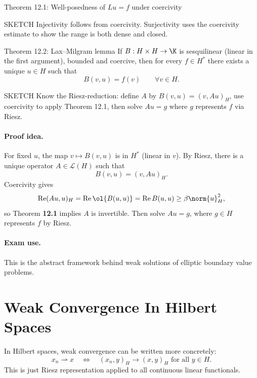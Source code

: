 \documentclass[header={Lecture 8 Exam Study Notes}]{study-note}
\begin{document}
\begin{thmbox}{Theorem 12.1: Well-posedness of $Lu=f$ under coercivity}
\thmCoerciveBijective
\end{thmbox}

\begin{prooflevelbox}{SKETCH}
Injectivity follows from coercivity. Surjectivity uses the coercivity estimate to show the range is both dense and closed.
\end{prooflevelbox}

\begin{thmbox}{Theorem 12.2: Lax--Milgram lemma}
If $B:H\times H\to\K$ is sesquilinear (linear in the first argument), bounded and coercive, then for every $f\in H^*$ there exists a unique $u\in H$ such that
\[
B(v,u)=f(v) \qquad \forall v\in H.
\]
\end{thmbox}

\begin{prooflevelbox}{SKETCH}
Know the Riesz-reduction: define $A$ by $B(v,u)=(v,Au)_H$, use coercivity to apply Theorem 12.1, then solve $Au=g$ where $g$ represents $f$ via Riesz.
\end{prooflevelbox}

\paragraph{Proof idea.}
For fixed $u$, the map $v\mapsto B(v,u)$ is in $H^*$ (linear in $v$). By Riesz, there is a unique operator $A\in\mathcal L(H)$ such that
\[
B(v,u)=(v,Au)_H.
\]
Coercivity gives
\[
\operatorname{Re}(Au,u)_H=\operatorname{Re}\ol{B(u,u)}=\operatorname{Re}B(u,u)\ge \beta\norm{u}_H^2,
\]
so Theorem \textbf{12.1} implies $A$ is invertible. Then solve $Au=g$, where $g\in H$ represents $f$ by Riesz.

\paragraph{Exam use.}
This is the abstract framework behind weak solutions of elliptic boundary value problems.

\section{Weak Convergence In Hilbert Spaces}

\begin{focusbox}
In Hilbert spaces, weak convergence can be written more concretely:
\[
x_n\rightharpoonup x \quad \Longleftrightarrow \quad (x_n,y)_H\to (x,y)_H \text{ for all } y\in H.
\]
This is just Riesz representation applied to all continuous linear functionals.
\end{focusbox}
\end{document}
